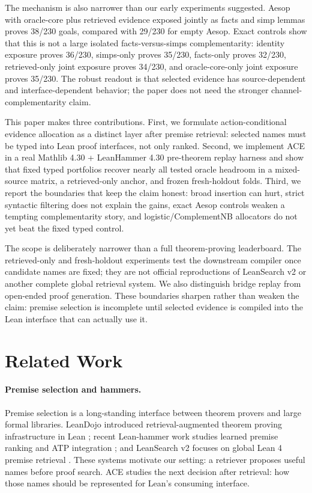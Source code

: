 \documentclass{article}
\newcommand{\tap}{\textsc{ACE}}
\begin{document}
The mechanism is also narrower than our early experiments suggested. Aesop with oracle-core plus retrieved evidence exposed jointly as facts and simp lemmas proves 38/230 goals, compared with 29/230 for empty Aesop. Exact controls show that this is not a large isolated facts-versus-simps complementarity: identity exposure proves 36/230, simps-only proves 35/230, facts-only proves 32/230, retrieved-only joint exposure proves 34/230, and oracle-core-only joint exposure proves 35/230. The robust readout is that selected evidence has source-dependent and interface-dependent behavior; the paper does not need the stronger channel-complementarity claim.

This paper makes three contributions. First, we formulate action-conditional evidence allocation as a distinct layer after premise retrieval: selected names must be typed into Lean proof interfaces, not only ranked. Second, we implement \tap{} in a real Mathlib 4.30 + LeanHammer 4.30 pre-theorem replay harness and show that fixed typed portfolios recover nearly all tested oracle headroom in a mixed-source matrix, a retrieved-only anchor, and frozen fresh-holdout folds. Third, we report the boundaries that keep the claim honest: broad insertion can hurt, strict syntactic filtering does not explain the gains, exact Aesop controls weaken a tempting complementarity story, and logistic/ComplementNB allocators do not yet beat the fixed typed control.

The scope is deliberately narrower than a full theorem-proving leaderboard. The retrieved-only and fresh-holdout experiments test the downstream compiler once candidate names are fixed; they are not official reproductions of LeanSearch v2 or another complete global retrieval system. We also distinguish bridge replay from open-ended proof generation. These boundaries sharpen rather than weaken the claim: premise selection is incomplete until selected evidence is compiled into the Lean interface that can actually use it.

\section{Related Work}

\paragraph{Premise selection and hammers.}
Premise selection is a long-standing interface between theorem provers and large formal libraries. LeanDojo introduced retrieval-augmented theorem proving infrastructure in Lean \citep{yang2023leandojo}; recent Lean-hammer work studies learned premise ranking and ATP integration \citep{zhu2025premise}; and LeanSearch v2 focuses on global Lean 4 premise retrieval \citep{gao2026leansearch}. These systems motivate our setting: a retriever proposes useful names before proof search. \tap{} studies the next decision after retrieval: how those names should be represented for Lean's consuming interface.
\end{document}

